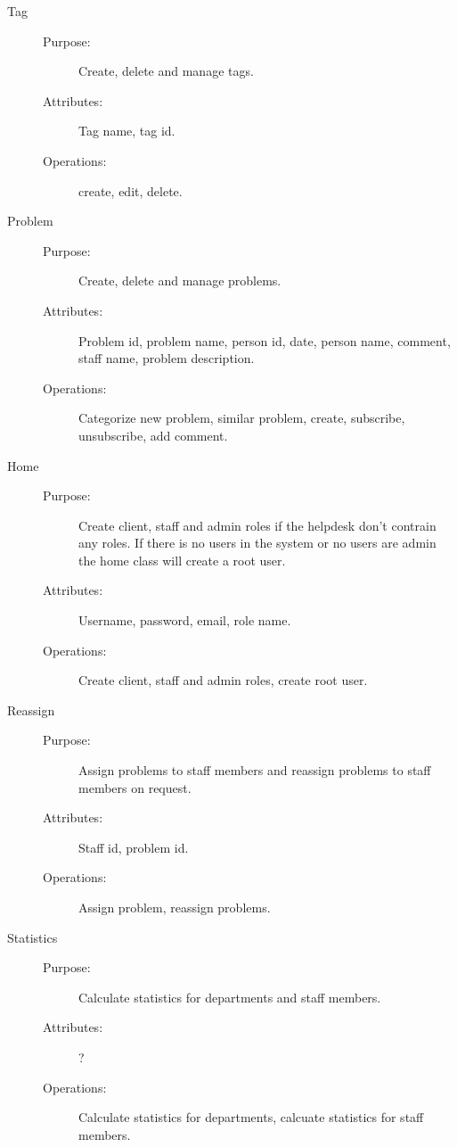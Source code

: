 \begin{description}
\item[Tag]\hfill
\begin{description}
\item[Purpose:]Create, delete and manage tags.
\item[Attributes:]Tag name, tag id.
\item[Operations:]create, edit, delete.
\end{description}
\end{description}

\begin{description}
\item[Problem]\hfill
\begin{description}
\item[Purpose:]Create, delete and manage problems.
\item[Attributes:]Problem id, problem name, person id, date, person name, comment, staff name, problem description.
\item[Operations:]Categorize new problem, similar problem, create, subscribe, unsubscribe, add comment.
\end{description}
\end{description}

\begin{description}
\item[Home]\hfill
\begin{description}
\item[Purpose:]Create client, staff and admin roles if the helpdesk don't contrain any roles. If there is no users in the system or no users are admin the home class will create a root user.
\item[Attributes:]Username, password, email, role name.
\item[Operations:]Create client, staff and admin roles, create root user.
\end{description}
\end{description}

\begin{description}
\item[Reassign]\hfill
\begin{description}
\item[Purpose:]Assign problems to staff members and reassign problems to staff members on request.
\item[Attributes:]Staff id, problem id.
\item[Operations:]Assign problem, reassign problems.
\end{description}
\end{description}

\begin{description}
\item[Statistics]\hfill
\begin{description}
\item[Purpose:]Calculate statistics for departments and staff members.
\item[Attributes:]?
\item[Operations:]Calculate statistics for departments, calcuate statistics for staff members.
\end{description}
\end{description}